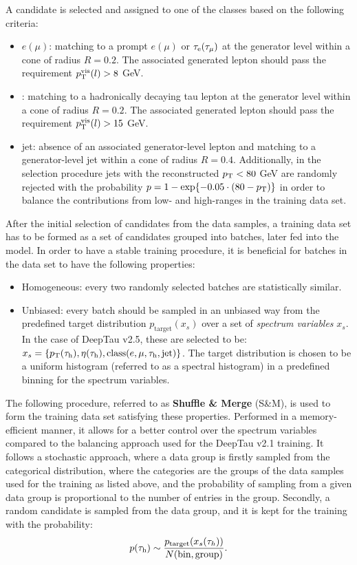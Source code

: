 A \tauh candidate is selected and assigned to one of the classes based on the following criteria:
\begin{itemize}
    \item $e (\mu)$: matching to a prompt $e (\mu)$ or $\tau_\mathrm{e} (\tau_\mu)$ at the generator level within a cone of radius $R=0.2$. The associated generated lepton should pass the requirement $p_{\text{T}}^{\text{vis}}(l)>8$ GeV.
    \item \tauh: matching to a hadronically decaying tau lepton at the generator level within a cone of radius $R=0.2$. The associated generated lepton should pass the requirement $p_{\text{T}}^{\text{vis}}(l)>15$ GeV.
    \item jet: absence of an associated generator-level lepton and matching to a generator-level jet within a cone of radius $R=0.4$. Additionally, in the selection procedure jets with the reconstructed $p_{\text{T}} < 80$ GeV are randomly rejected with the probability $p = 1 - \exp{-0.05\cdot(80-\ensuremath{p_{\text{T}}})}$ in order to balance the contributions from low- and high-\pt ranges in the training data set.
\end{itemize}

After the initial selection of \tauh candidates from the data samples, a training data set has to be formed as a set of \tauh candidates grouped into batches, later fed into the model. In order to have a stable training procedure, it is beneficial for batches in the data set to have the following properties:
\begin{itemize}
    \item Homogeneous: every two randomly selected batches are statistically similar. 
    \item Unbiased: every batch should be sampled in an unbiased way from the predefined target distribution $p_\text{target}(x_s)$ over a set of \textit{spectrum variables} $x_s$. In the case of DeepTau v2.5, these are selected to be: $x_s = \{p_{\text{T}}(\tau_\mathrm{h}), \eta(\tau_\mathrm{h}), \text{class}(e, \mu, \tau_\mathrm{h}, \text{jet})\}$. The target distribution is chosen to be a uniform histogram (referred to as a spectral histogram) in a predefined binning for the spectrum variables. 
\end{itemize}

The following procedure, referred to as \textbf{Shuffle \& Merge} (S\&M), is used to form the training data set satisfying these properties. Performed in a memory-efficient manner, it allows for a better control over the spectrum variables compared to the balancing approach used for the DeepTau v2.1 training. It follows a stochastic approach, where a data group is firstly sampled from the categorical distribution, where the categories are the groups of the data samples used for the training as listed above, and the probability of sampling from a given data group is proportional to the number of entries in the group. Secondly, a random \tauh candidate is sampled from the data group, and it is kept for the training with the probability:
\begin{equation}
    p(\tau_\mathrm{h}) \sim \dfrac{p_\text{target}(x_s(\tau_h))}{N(\text{bin},\text{group})}.
\end{equation}

